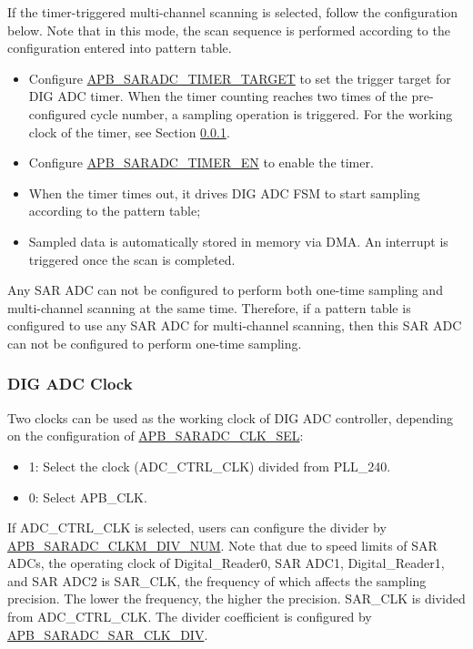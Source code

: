 \documentclass[main\_\_EN.tex]{subfiles}
\begin{document}
If the timer-triggered multi-channel scanning is selected, follow the configuration below. Note that in this mode, the scan sequence is performed according to the configuration entered into pattern table. 
\begin{itemize} 
        \item Configure  \hyperref[fielddesc:APBSARADCSARADCTIMERTARGET]{APB\_SARADC\_TIMER\_TARGET} to set the trigger target for DIG ADC timer. When the timer counting reaches two times of the pre-configured cycle number, a sampling operation is triggered. For the working clock of the timer, see Section \ref{other:sensor-para-dig-adc-clock}.
        \item Configure  \hyperref[fielddesc:APBSARADCSARADCTIMEREN]{APB\_SARADC\_TIMER\_EN} to enable the timer.
        \item When the timer times out, it drives DIG ADC FSM to start sampling according to the pattern table;
        \item Sampled data is automatically stored in memory via DMA. An interrupt is triggered once the scan is completed.
\end{itemize}

\begin{tiplisting}
Any SAR ADC can not be configured to perform both one-time sampling and multi-channel scanning at the same time. Therefore, if a pattern table is configured to use any SAR ADC for multi-channel scanning, then this SAR ADC can not be configured to perform one-time sampling.
\end{tiplisting}

\subsubsection{DIG ADC Clock}\label{other:sensor-para-dig-adc-clock}
Two clocks can be used as the working clock of DIG ADC controller, depending on the configuration of \hyperref[fielddesc:APBSARADCCLKSEL]{APB\_SARADC\_CLK\_SEL}:
\begin{itemize}
    \item 1: Select the clock (ADC\_CTRL\_CLK) divided from PLL\_240.
    \item 0: Select APB\_CLK.
\end{itemize}

If ADC\_CTRL\_CLK is selected, users can configure the divider by \hyperref[fielddesc:APBSARADCCLKMDIVNUM]{APB\_SARADC\_CLKM\_DIV\_NUM}. Note that due to speed limits of SAR ADCs, the operating clock of Digital\_Reader0, SAR ADC1, Digital\_Reader1, and SAR ADC2 is SAR\_CLK, the frequency of which affects the sampling precision. The lower the frequency, the higher the precision. SAR\_CLK is divided from ADC\_CTRL\_CLK. The divider coefficient is configured by \hyperref[fielddesc:APBSARADCSARADCSARCLKDIV]{APB\_SARADC\_SAR\_CLK\_DIV}.
\end{document}

